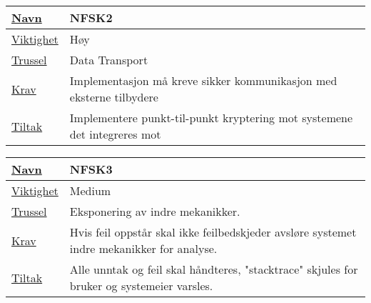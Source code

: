 \begin{tabularx}{\textwidth}{|l|X|}
  \hline
  \underline{Navn} & NFSK2 \\ \hline
  \underline{Viktighet} & Høy \\ \hline
  \underline{Trussel} & Data Transport \\ \hline
  \underline{Krav} & Implementasjon må kreve sikker kommunikasjon med eksterne tilbydere \\ \hline
  \underline{Tiltak} & Implementere punkt-til-punkt kryptering mot systemene det integreres mot \\ \hline
\end{tabularx}

\begin{tabularx}{\textwidth}{|l|X|}
  \hline
  \underline{Navn} & NFSK3 \\ \hline
  \underline{Viktighet} & Medium \\ \hline
  \underline{Trussel} & Eksponering av indre mekanikker. \\ \hline
  \underline{Krav} & Hvis feil oppstår skal ikke feilbedskjeder avsløre systemet indre mekanikker for analyse. \\ \hline
  \underline{Tiltak} & Alle unntak og feil skal håndteres, "stacktrace" skjules for bruker og systemeier varsles. \\ \hline
\end{tabularx}



